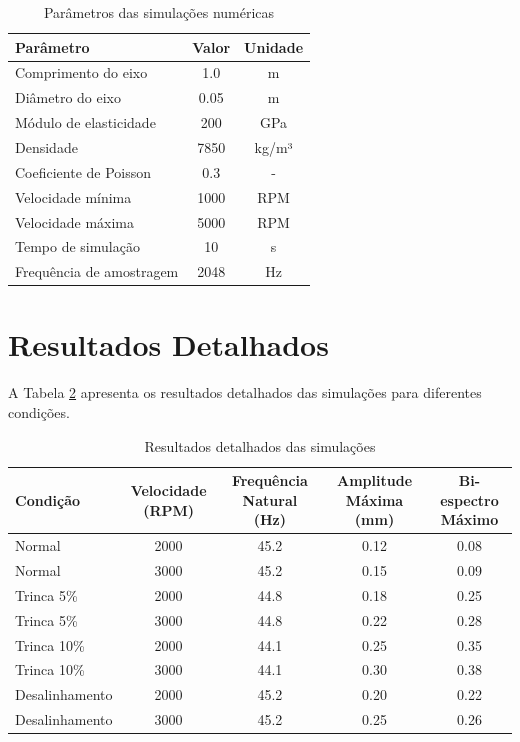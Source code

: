 \begin{table}[H]
    \centering
    \caption{Parâmetros das simulações numéricas}
    \begin{tabular}{lcc}
        \toprule
        Parâmetro & Valor & Unidade \\
        \midrule
        Comprimento do eixo & 1.0 & m \\
        Diâmetro do eixo & 0.05 & m \\
        Módulo de elasticidade & 200 & GPa \\
        Densidade & 7850 & kg/m³ \\
        Coeficiente de Poisson & 0.3 & - \\
        Velocidade mínima & 1000 & RPM \\
        Velocidade máxima & 5000 & RPM \\
        Tempo de simulação & 10 & s \\
        Frequência de amostragem & 2048 & Hz \\
        \bottomrule
    \end{tabular}
    \label{tab:parametros_simulacao}
\end{table}

\section{Resultados Detalhados}

A Tabela \ref{tab:resultados_detalhados} apresenta os resultados detalhados das simulações para diferentes condições.

\begin{table}[H]
    \centering
    \caption{Resultados detalhados das simulações}
    \begin{tabular}{lcccc}
        \toprule
        Condição & Velocidade (RPM) & Frequência Natural (Hz) & Amplitude Máxima (mm) & Bi-espectro Máximo \\
        \midrule
        Normal & 2000 & 45.2 & 0.12 & 0.08 \\
        Normal & 3000 & 45.2 & 0.15 & 0.09 \\
        Trinca 5\% & 2000 & 44.8 & 0.18 & 0.25 \\
        Trinca 5\% & 3000 & 44.8 & 0.22 & 0.28 \\
        Trinca 10\% & 2000 & 44.1 & 0.25 & 0.35 \\
        Trinca 10\% & 3000 & 44.1 & 0.30 & 0.38 \\
        Desalinhamento & 2000 & 45.2 & 0.20 & 0.22 \\
        Desalinhamento & 3000 & 45.2 & 0.25 & 0.26 \\
        \bottomrule
    \end{tabular}
    \label{tab:resultados_detalhados}
\end{table}

